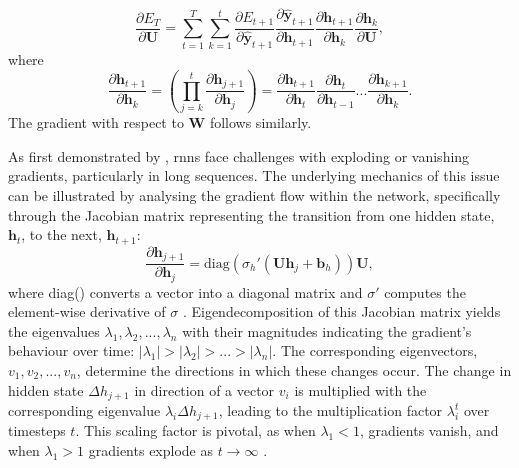 \documentclass[12pt, a4paper, headinclude, twoside, plainheadsepline, open=right, numbers=noenddot, hidelinks, toc=listof, toc=bibliography]{scrreprt}
\begin{document}
\begin{equation}
\label{eq:bptt_U}
\frac{\partial E_T}{\partial \mathbf{U}} = 
\sum_{t=1}^{T}
\sum_{k=1}^{t}
\frac{\partial E_{t+1}}{\partial \mathbf{\hat{y}}_{t+1}}
\frac{\partial \mathbf{\hat{y}}_{t+1}}{\partial \mathbf{h}_{t+1}}
\frac{\partial \mathbf{h}_{t+1}}{\partial \mathbf{h}_k}
\frac{\partial \mathbf{h}_k}{\partial \mathbf{U}},
\end{equation}
where
\begin{equation}
\label{eq:bptt_ht+1}
\frac{\partial \mathbf{h}_{t+1}}{\partial \mathbf{h}_k} 
= 
\left(\prod_{j=k}^{t}\frac{\partial \mathbf{h}_{j+1}}{\partial \mathbf{h}_j}\right)
=
\frac{\partial \mathbf{h}_{t+1}}{\partial \mathbf{h}_t}
\frac{\partial \mathbf{h}_{t}}{\partial \mathbf{h}_{t-1}}
 . . . 
\frac{\partial \mathbf{h}_{k+1}}{\partial \mathbf{h}_k}.
\end{equation}
The gradient with respect to $\mathbf{W}$ follows similarly.

As first demonstrated by \citeauthor{bengioLearningLongtermDependencies1994} \cite{bengioLearningLongtermDependencies1994}, \acp{rnn} face challenges with exploding or vanishing gradients, particularly in long sequences.
The underlying mechanics of this issue can be illustrated by analysing the gradient flow within the network, specifically through the Jacobian matrix representing the transition from one hidden state, $\mathbf{h}_t$, to the next, $\mathbf{h}_{t+1}$:
\begin{equation}
\label{eq:bptt_jacobian}
\frac{\partial \mathbf{h}_{j+1}}{\partial \mathbf{h}_j} = \text{diag}(\sigma_h' (\mathbf{U} \mathbf{h}_j + \mathbf{b}_h)) \mathbf{U},
\end{equation}
where diag() converts a vector into a diagonal matrix and $\sigma '$ computes the element-wise derivative of $\sigma$
\cite{pascanuDifficultyTrainingRecurrent2013}.
Eigendecomposition of this Jacobian matrix yields the eigenvalues $ \lambda_1, \lambda_2, ..., \lambda_n$ with their magnitudes indicating the gradient's behaviour over time: $|\lambda_1| > |\lambda_2| > ... > |\lambda_n|$.
The corresponding eigenvectors, $v_1, v_2, ..., v_n$, determine the directions in which these changes occur.
The change in hidden state $\Delta h_{j+1}$ in direction of a vector $v_i$ is multiplied with the corresponding eigenvalue $\lambda_i \Delta h_{j+1}$, leading to the multiplication factor $\lambda_i^t$ over timesteps $t$.
This scaling factor is pivotal, as when $\lambda_1 < 1$, gradients vanish, and when $\lambda_1 > 1$ gradients explode as $t \to \infty$ \cite{pascanuDifficultyTrainingRecurrent2013}.
\end{document}
